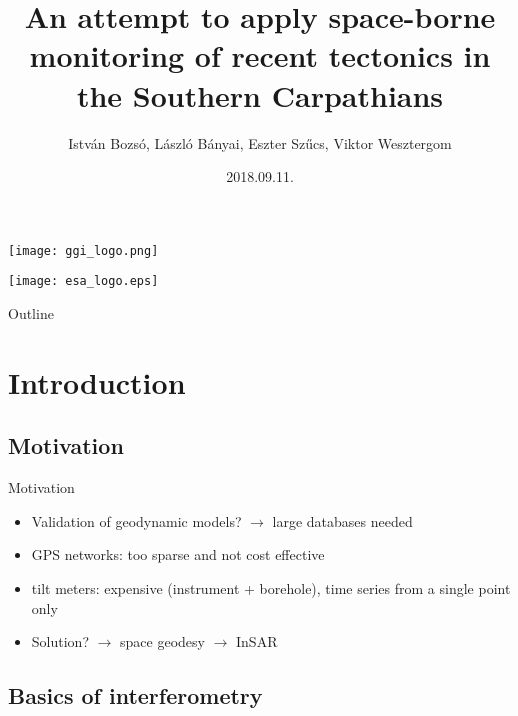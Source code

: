 \documentclass[aspectratio=169]{beamer}
\title[InSAR]{An attempt to apply space-borne monitoring of recent tectonics in the Southern Carpathians}
\author{István Bozsó, László Bányai, Eszter Szűcs, Viktor Wesztergom}
\institute{MTA CSFK Geodetic and Geophysical Institute}
\date{2018.09.11.}
\begin{document}
\begin{frame}
    \titlepage
    \begin{center}
        \begin{minipage}[c]{0.25\textwidth}
            \texttt{[image: ggi\_logo.png]}
        \end{minipage}
        \hspace{25pt}
        \begin{minipage}[c]{0.25\textwidth}
            \texttt{[image: esa\_logo.eps]}
        \end{minipage}
    \end{center}
\end{frame}

\begin{frame}{Outline}
    \tableofcontents
\end{frame}

\section{Introduction}

\subsection{Motivation}

\begin{frame}{Motivation}
\begin{itemize}
    \pause
    \item Validation of geodynamic models? $\rightarrow$ large databases needed
    \pause
    \item GPS networks: too sparse and not cost effective
    \pause
    \item tilt meters: expensive (instrument + borehole), time series from a single point only
    \pause
    \item Solution? \pause $\rightarrow$ space geodesy \pause $\rightarrow$ InSAR
\end{itemize}
\end{frame}

\subsection{Basics of interferometry}
\end{document}
